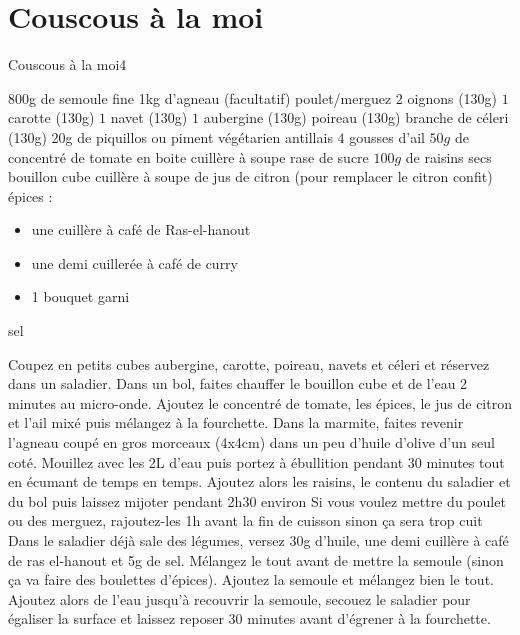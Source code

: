 {\section{Couscous à la moi}
\begin{recette}{Couscous à la moi}{4}{}{}
\begin{ingredients}[8 pers.]
\ingredient 800g de semoule fine
\ingredient 1kg d'agneau
\ingredient (facultatif) poulet/merguez
\ingredient $2$ oignons (130g)
\ingredient $1$ carotte (130g)
\ingredient $1$ navet (130g)
\ingredient $1$ aubergine (130g)
 poireau (130g)
 branche de céleri (130g)
\ingredient[falcultatif] 20g de piquillos ou piment végétarien antillais
\ingredient $4$ gousses d'ail
\ingredient $50\unit{g}$ de concentré de tomate en boite %
 cuillère à soupe rase de sucre
\ingredient $100\unit{g}$ de raisins secs
 bouillon cube
 cuillère à soupe de jus de citron (pour remplacer le citron confit)
\ingredient épices : \begin{itemize}
		\item une cuillère à café de Ras-el-hanout
		\item une demi cuillerée à café de curry
		\item 1 bouquet garni
		\end{itemize}
\ingredient sel
\end{ingredients}

\begin{preparation}
\etape Coupez en petits cubes aubergine, carotte, poireau, navets et céleri et réservez dans un saladier.
\etape Dans un bol, faites chauffer le bouillon cube et de l'eau 2 minutes au micro-onde. Ajoutez le concentré de tomate, les épices, le jus de citron et l'ail mixé puis mélangez à la fourchette. 
\etape Dans la marmite, faites revenir l'agneau coupé en gros morceaux (4x4cm) dans un peu d'huile d'olive d'un seul coté.
\etape Mouillez avec les 2L d'eau puis portez à ébullition pendant 30 minutes tout en écumant de temps en temps. 
\etape Ajoutez alors les raisins, le contenu du saladier et du bol puis laissez mijoter pendant 2h30 environ
\etape Si vous voulez mettre du poulet ou des merguez, rajoutez-les 1h avant la fin de cuisson sinon ça sera trop cuit
\etape Dans le saladier déjà sale des légumes, versez 30g d'huile, une demi cuillère à café de ras el-hanout et 5g de sel. Mélangez le tout avant de mettre la semoule (sinon ça va faire des boulettes d'épices).
\etape Ajoutez la semoule et mélangez bien le tout. 
\etape Ajoutez alors de l'eau jusqu'à recouvrir la semoule, secouez le saladier pour égaliser la surface et laissez reposer 30 minutes avant d'égrener à la fourchette.
\end{preparation}
\end{recette}


}
